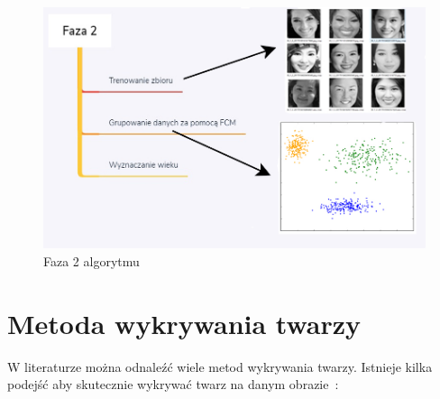 \documentclass[a4paper,twoside,12pt]{book}
\begin{document}
    \begin{figure}[ht!]
        \centering
        \includegraphics[width=12cm]{Obrazy/Faza2.jpg}
        \caption{Faza 2 algorytmu}
        \label{fig.faza2Algorytmu}
    \end{figure}

    \clearpage
    \section{Metoda wykrywania twarzy}\label{sec:metodaWykrywaniaTwarzy}
    W literaturze można odnaleźć wiele metod wykrywania twarzy.
    Istnieje kilka podejść aby skutecznie wykrywać twarz na danym obrazie~\cite{mehdiRizvi}:
\end{document}
